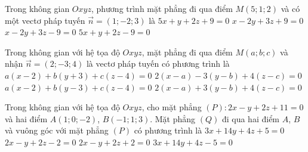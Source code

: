 \begin{ex}%
	Trong không gian $Oxyz$, phương trình mặt phẳng  đi qua điểm $M(5; 1; 2)$ và có một vectơ pháp tuyến $\overrightarrow{n}=(1;-2; 3)$ là
	\choice 
		{$5 x+y+2  z+9=0$}
		 {$x-2 y+3 z+9=0$}
		{\True  $x-2 y+3 z-9=0$}
		{$5 x+y+2  z-9=0$}
\end{ex}

\begin{ex}%
	Trong không gian với hệ tọa độ  $Oxyz$, mặt phẳng đi qua điểm $M(a;b;c)$ và nhận $\overrightarrow{n}=(2;-3;4)$ là vectơ pháp tuyến có phương trình là
	 \choice
		{$a(x-2)+b(y+3)+c(z-4)=0$} 
		{\True $2(x-a)-3(y-b)+4(z-c)=0$} 
		{$a(x-2)+b(y-3)+c(z-4)=0$} 
		{$2(x-a)+3(y-b)+4(z-c)=0$} 
\end{ex}

\begin{ex}%
	Trong không gian với hệ tọa độ  $Oxyz$, cho mặt phẳng $(P)\colon 2x - y + 2z + 11 = 0$ và hai điểm $A(1;0;-2)$, $B(-1;1;3)$. Mặt phẳng $(Q)$ đi qua hai điểm $A$, $B$ và vuông góc với mặt phẳng $(P)$ có phương trình là
	 \choice
		{\True $3x +  14y + 4z + 5 = 0$}
		{$2x - y + 2z - 2  = 0$}
		{$2x - y  + 2z + 2 = 0$}
		{$3x + 14y + 4z - 5  = 0$}
\end{ex}

